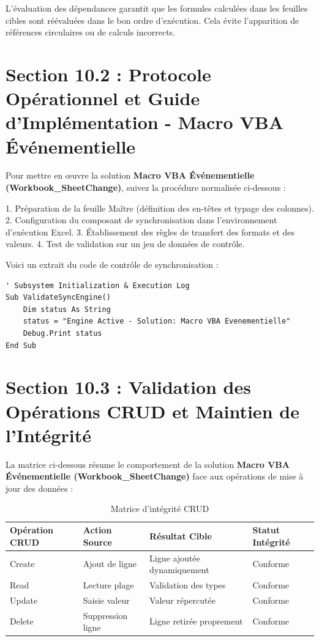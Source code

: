 \documentclass[12pt,a4paper]{report}
\begin{document}
L'évaluation des dépendances garantit que les formules calculées dans les feuilles cibles sont réévaluées dans le bon ordre d'exécution. Cela évite l'apparition de références circulaires ou de calculs incorrects.


\section{Section 10.2 : Protocole Opérationnel et Guide d'Implémentation - Macro VBA Événementielle}
Pour mettre en œuvre la solution \textbf{Macro VBA Événementielle (Workbook\_SheetChange)}, suivez la procédure normalisée ci-dessous :

1. Préparation de la feuille Maître (définition des en-têtes et typage des colonnes).
2. Configuration du composant de synchronisation dans l'environnement d'exécution Excel.
3. Établissement des règles de transfert des formats et des valeurs.
4. Test de validation sur un jeu de données de contrôle.

Voici un extrait du code de contrôle de synchronisation :
\begin{lstlisting}[caption=Code de controle operationnel]
' Subsystem Initialization & Execution Log
Sub ValidateSyncEngine()
    Dim status As String
    status = "Engine Active - Solution: Macro VBA Evenementielle"
    Debug.Print status
End Sub
\end{lstlisting}


\section{Section 10.3 : Validation des Opérations CRUD et Maintien de l'Intégrité}
La matrice ci-dessous résume le comportement de la solution \textbf{Macro VBA Événementielle (Workbook\_SheetChange)} face aux opérations de mise à jour des données :

\begin{table}[h]
\centering
\begin{tabular}{@{}llll@{}}
\toprule
\textbf{Opération CRUD} & \textbf{Action Source} & \textbf{Résultat Cible} & \textbf{Statut Intégrité} \\ \midrule
Create & Ajout de ligne & Ligne ajoutée dynamiquement & Conforme \\
Read & Lecture plage & Validation des types & Conforme \\
Update & Saisie valeur & Valeur répercutée & Conforme \\
Delete & Suppression ligne & Ligne retirée proprement & Conforme \\ \bottomrule
\end{tabular}
\caption{Matrice d'intégrité CRUD}
\end{table}
\end{document}
